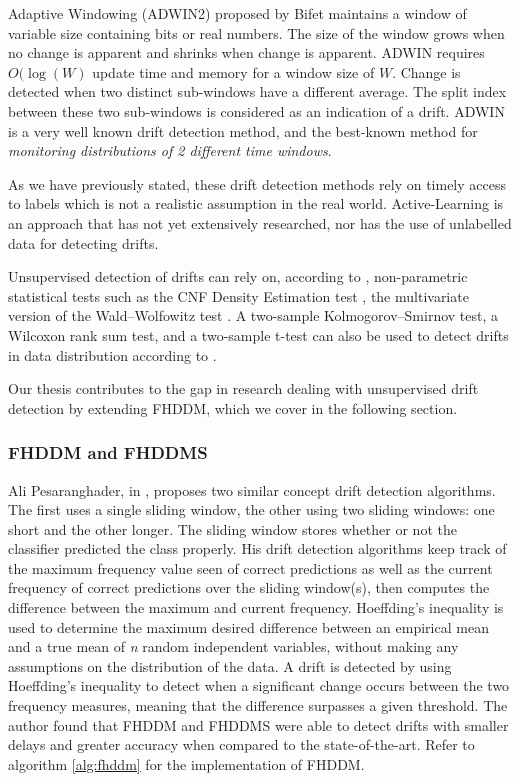 Adaptive Windowing (ADWIN2) proposed by Bifet\cite{bifet2007learning} maintains a window of variable size containing bits or real numbers. The size of the window grows when no change is apparent and shrinks when change is apparent. ADWIN requires $O(\log(W)$ update time and memory for a window size of $W$. Change is detected when two distinct sub-windows have a different average. The split index between these two sub-windows is considered as an indication of a drift. ADWIN is a very well known drift detection method, and the best-known method for \textit{monitoring distributions of 2 different time windows}.

As we have previously stated, these drift detection methods rely on timely access to labels which is not a realistic assumption in the real world.  Active-Learning is an approach that has not yet extensively researched, nor has the use of unlabelled data for detecting drifts.

Unsupervised detection of drifts can rely on, according to \cite{sobolewski2013concept}, non-parametric statistical tests such as the CNF Density Estimation test \cite{dries2009adaptive}, the multivariate version of the Wald–Wolfowitz test \cite{friedman1979multivariate}.
A two-sample Kolmogorov–Smirnov test, a Wilcoxon rank sum test, and a two-sample t-test can also be used to detect drifts in data distribution according to \cite{sobolewski2013concept, sheskin2003handbook}.

Our thesis contributes to the gap in research dealing with unsupervised drift detection by extending FHDDM, which we cover in the following section.

\subsubsection{FHDDM and FHDDMS\label{section:fhddm/s}}
Ali Pesaranghader, in \parencite{pesaranghader2018reservoirthesis,pesaranghader2018reservoir, pesaranghader2016fast}, proposes two similar concept drift detection algorithms. The first uses a single sliding window, the other using two sliding windows: one short and the other longer. The sliding window stores whether or not the classifier predicted the class properly. His drift detection algorithms keep track of the maximum frequency value seen of correct predictions as well as the current frequency of correct predictions over the sliding window(s), then computes the difference between the maximum and current frequency. Hoeffding's inequality is used to determine the maximum desired difference between an empirical mean and a true mean of \textit{n} random independent variables, without making any assumptions on the distribution of the data. A drift is detected by using Hoeffding's inequality to detect when a significant change occurs between the two frequency measures, meaning that the difference surpasses a given threshold. The author found that FHDDM and FHDDMS were able to detect drifts with smaller delays and greater accuracy when compared to the state-of-the-art. Refer to algorithm \ref{alg:fhddm} for the implementation of FHDDM.

